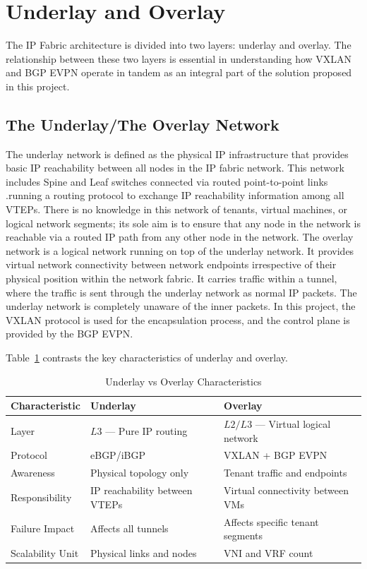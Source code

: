 \section{Underlay and Overlay}
The IP Fabric architecture is divided into two layers: underlay and overlay. The relationship between these two layers is essential in understanding how VXLAN and BGP EVPN operate in tandem as an integral part of the solution proposed in this project.

\subsection{The Underlay/The Overlay Network}
The underlay network is defined as the physical IP infrastructure that provides basic IP reachability between all nodes in the IP fabric network\cite{VXLAN_Network_with_MP-BGP_EVPN_Control_Plane_Design_Guide}. This network includes Spine and Leaf switches connected via routed point-to-point links .running a routing protocol to exchange IP reachability information among all VTEPs. There is no knowledge in this network of tenants, virtual machines, or logical network segments; its sole aim is to ensure that any node in the network is reachable via a routed IP path from any other node in the network.
The overlay network is a logical network running on top of the underlay network. It provides virtual network connectivity between network endpoints irrespective of their physical position within the network fabric\cite{IETFRFC7365}. It carries traffic within a tunnel, where the traffic is sent through the underlay network as normal IP packets. The underlay network is completely unaware of the inner packets. In this project, the VXLAN protocol is used for the encapsulation process, and the control plane is provided by the BGP EVPN.

Table~\ref{tab:underlay-overlay} contrasts the key characteristics of underlay and overlay.

\begin{table}[!htbp]
\small
\centering
\begin{tabularx}{\textwidth}{@{}lXX@{}}
\toprule
\textbf{Characteristic} & \textbf{Underlay} & \textbf{Overlay} \\ \midrule
Layer & $L3$ — Pure IP routing & $L2/L3$ — Virtual logical network \\ \midrule
Protocol & eBGP/iBGP & VXLAN + BGP EVPN \\ \midrule
Awareness & Physical topology only & Tenant traffic and endpoints \\ \midrule
Responsibility & IP reachability between VTEPs & Virtual connectivity between VMs \\ \midrule
Failure Impact & Affects all tunnels & Affects specific tenant segments \\ \midrule
Scalability Unit & Physical links and nodes & VNI and VRF count \\ \bottomrule
\end{tabularx}
\caption{Underlay vs Overlay Characteristics}
\label{tab:underlay-overlay}
\end{table}

